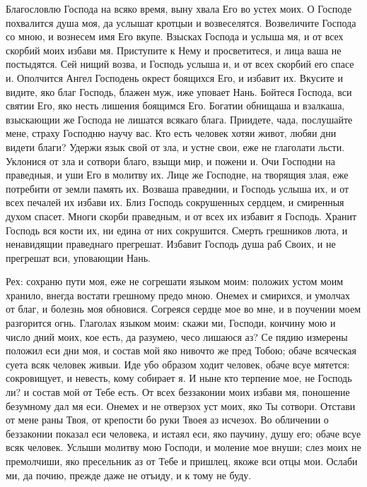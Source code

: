 Благословлю Господа на всяко время, выну хвала Его во устех моих. О Господе похвалится душа моя, да услышат кротцыи и возвеселятся. Возвеличите Господа со мною, и вознесем имя Его вкупе. Взысках Господа и услыша мя, и от всех скорбий моих избави мя. Приступите к Нему и просветитеся, и лица ваша не постыдятся. Сей нищий возва, и Господь услыша и, и от всех скорбий его спасе и. Ополчится Ангел Господень окрест боящихся Его, и избавит их. Вкусите и видите, яко благ Господь, блажен муж, иже уповает Нань. Бойтеся Господа, вси святии Его, яко несть лишения боящимся Его. Богатии обнищаша и взалкаша, взыскающии же Господа не лишатся всякаго блага. Приидете, чада, послушайте мене, страху Господню научу вас. Кто есть человек хотяи живот, любяи дни видети благи? Удержи язык свой от зла, и устне свои, еже не глаголати льсти. Уклонися от зла и сотвори благо, взыщи мир, и пожени и. Очи Господни на праведныя, и уши Его в молитву их. Лице же Господне, на творящия злая, еже потребити от земли память их. Возваша праведнии, и Господь услыша их, и от всех печалей их избави их. Близ Господь сокрушенных сердцем, и смиренныя духом спасет. Многи скорби праведным, и от всех их избавит я Господь. Хранит Господь вся кости их, ни едина от них сокрушится. Смерть грешников люта, и ненавидящии праведнаго прегрешат. Избавит Господь душа раб Своих, и не прегрешат вси, уповающии Нань.




Рех: сохраню пути моя, еже не согрешати языком моим: положих устом моим хранило, внегда востати грешному предо мною. Онемех и смирихся, и умолчах от благ, и болезнь моя обновися. Согреяся сердце мое во мне, и в поучении моем разгорится огнь. Глаголах языком моим: скажи ми, Господи, кончину мою и число дний моих, кое есть, да разумею, чесо лишаюся аз? Се пядию измерены положил еси дни моя, и состав мой яко нивочто же пред Тобою; обаче всяческая суета всяк человек живыи. Иде убо образом ходит человек, обаче всуе мятется: сокровищует, и невесть, кому собирает я. И ныне кто терпение мое, не Господь ли? и состав мой от Тебе есть. От всех беззаконии моих избави мя, поношение безумному дал мя еси. Онемех и не отверзох уст моих, яко Ты сотвори. Отстави от мене раны Твоя, от крепости бо руки Твоея аз исчезох. Во обличении о беззаконии показал еси человека, и истаял еси, яко паучину, душу его; обаче всуе всяк человек. Услыши молитву мою Господи, и моление мое внуши; слез моих не премолчиши, яко пресельник аз от Тебе и пришлец, якоже вси отцы мои. Ослаби ми, да почию, прежде даже не отъиду, и к тому не буду.


